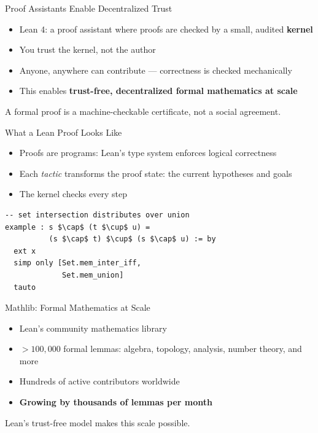 \documentclass{beamer}
\newcommand{\highlight}[1]{\textcolor{improverOrange}{\textbf{#1}}}
\begin{document}
\begin{frame}{Proof Assistants Enable Decentralized Trust}
\vspace{0.8em}
\begin{itemize}\setlength{\itemsep}{10pt}
  \item Lean 4: a proof assistant where proofs are checked by a small, audited \textbf{kernel}
  \item You trust the kernel, not the author
  \item Anyone, anywhere can contribute --- correctness is checked mechanically
  \item This enables \highlight{trust-free, decentralized formal mathematics at scale}
\end{itemize}
\vspace{0.8em}
\begin{exampleblock}{}
  \centering A formal proof is a machine-checkable certificate, not a social agreement.
\end{exampleblock}
\end{frame}

\begin{frame}[fragile]{What a Lean Proof Looks Like}
\vspace{0.5em}
\begin{itemize}\setlength{\itemsep}{6pt}
  \item Proofs are programs: Lean's type system enforces logical correctness
  \item Each \emph{tactic} transforms the proof state: the current hypotheses and goals
  \item The kernel checks every step
\end{itemize}
\vspace{0.6em}
\begin{lstlisting}[basicstyle=\footnotesize\ttfamily]
-- set intersection distributes over union
example : s $\cap$ (t $\cup$ u) =
          (s $\cap$ t) $\cup$ (s $\cap$ u) := by
  ext x
  simp only [Set.mem_inter_iff,
             Set.mem_union]
  tauto
\end{lstlisting}
\end{frame}

\begin{frame}{Mathlib: Formal Mathematics at Scale}
\vspace{0.8em}
\begin{itemize}\setlength{\itemsep}{10pt}
  \item Lean's community mathematics library
  \item $>100{,}000$ formal lemmas: algebra, topology, analysis, number theory, and more
  \item Hundreds of active contributors worldwide
  \item \highlight{Growing by thousands of lemmas per month}
\end{itemize}
\vspace{0.8em}
\begin{exampleblock}{}
  \centering Lean's trust-free model makes this scale possible.
\end{exampleblock}
\end{frame}
\end{document}
